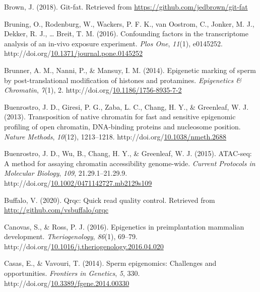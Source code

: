 \documentclass[12pt,twoside]{reedthesis}
\newlength{\cslhangindent}
\newenvironment{CSLReferences}[2] %
 {%
  \setlength{\parindent}{0pt}
  \ifodd #1 \everypar{\setlength{\hangindent}{\cslhangindent}}\ignorespaces\fi
  \ifnum #2 > 0
  \setlength{\parskip}{#2\baselineskip}
  \fi
 }%
 {}
\begin{document}
\begin{CSLReferences}{1}{0}
\leavevmode{}%
Brown, J. (2018). Git-fat. Retrieved from \url{https://github.com/jedbrown/git-fat}

\leavevmode{}%
Bruning, O., Rodenburg, W., Wackers, P. F. K., van Oostrom, C., Jonker, M. J., Dekker, R. J., \ldots{} Breit, T. M. (2016). Confounding factors in the transcriptome analysis of an in-vivo exposure experiment. \emph{Plos One}, \emph{11}(1), e0145252. http://doi.org/\href{https://doi.org/10.1371/journal.pone.0145252}{10.1371/journal.pone.0145252}

\leavevmode{}%
Brunner, A. M., Nanni, P., \& Mansuy, I. M. (2014). Epigenetic marking of sperm by post-translational modification of histones and protamines. \emph{Epigenetics \& Chromatin}, \emph{7}(1), 2. http://doi.org/\href{https://doi.org/10.1186/1756-8935-7-2}{10.1186/1756-8935-7-2}

\leavevmode{}%
Buenrostro, J. D., Giresi, P. G., Zaba, L. C., Chang, H. Y., \& Greenleaf, W. J. (2013). Transposition of native chromatin for fast and sensitive epigenomic profiling of open chromatin, DNA-binding proteins and nucleosome position. \emph{Nature Methods}, \emph{10}(12), 1213--1218. http://doi.org/\href{https://doi.org/10.1038/nmeth.2688}{10.1038/nmeth.2688}

\leavevmode{}%
Buenrostro, J. D., Wu, B., Chang, H. Y., \& Greenleaf, W. J. (2015). ATAC-seq: A method for assaying chromatin accessibility genome-wide. \emph{Current Protocols in Molecular Biology}, \emph{109}, 21.29.1--21.29.9. http://doi.org/\href{https://doi.org/10.1002/0471142727.mb2129s109}{10.1002/0471142727.mb2129s109}

\leavevmode{}%
Buffalo, V. (2020). Qrqc: Quick read quality control. Retrieved from \url{http://github.com/vsbuffalo/qrqc}

\leavevmode{}%
Canovas, S., \& Ross, P. J. (2016). Epigenetics in preimplantation mammalian development. \emph{Theriogenology}, \emph{86}(1), 69--79. http://doi.org/\href{https://doi.org/10.1016/j.theriogenology.2016.04.020}{10.1016/j.theriogenology.2016.04.020}

\leavevmode{}%
Casas, E., \& Vavouri, T. (2014). Sperm epigenomics: Challenges and opportunities. \emph{Frontiers in Genetics}, \emph{5}, 330. http://doi.org/\href{https://doi.org/10.3389/fgene.2014.00330}{10.3389/fgene.2014.00330}


\end{CSLReferences}
\end{document}
